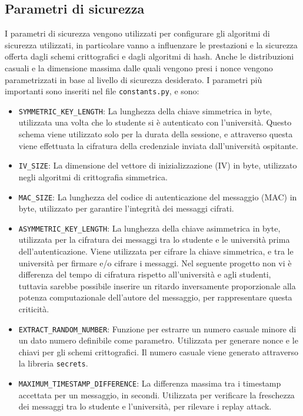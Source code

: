 \documentclass[a4paper,12pt]{article}
\begin{document}
\subsection{Parametri di sicurezza}
I parametri di sicurezza vengono utilizzati per configurare gli algoritmi di sicurezza utilizzati, in particolare vanno a influenzare le prestazioni e la sicurezza offerta dagli schemi crittografici e dagli algoritmi di hash. Anche le distribuzioni casuali e la dimensione massima dalle quali vengono presi i nonce vengono parametrizzati in base al livello di sicurezza desiderato. I parametri più importanti sono inseriti nel file \texttt{constants.py}, e sono:
\begin{itemize}
    \item \texttt{SYMMETRIC\_KEY\_LENGTH}: La lunghezza della chiave simmetrica in byte, utilizzata una volta che lo studente si è autenticato con l'università. Questo schema viene utilizzato solo per la durata della sessione, e attraverso questa viene effettuata la cifratura della credenziale inviata dall'università ospitante.
    \item \texttt{IV\_SIZE}: La dimensione del vettore di inizializzazione (IV) in byte, utilizzato negli algoritmi di crittografia simmetrica.
    \item \texttt{MAC\_SIZE}: La lunghezza del codice di autenticazione del messaggio (MAC) in byte, utilizzato per garantire l'integrità dei messaggi cifrati.
    \item \texttt{ASYMMETRIC\_KEY\_LENGTH}: La lunghezza della chiave asimmetrica in byte, utilizzata per la cifratura dei messaggi tra lo studente e le università prima dell'autenticazione. Viene utilizzata per cifrare la chiave simmetrica, e tra le università per firmare e/o cifrare i messaggi. Nel seguente progetto non vi è differenza del tempo di cifratura rispetto all'università e agli studenti, tuttavia sarebbe possibile inserire un ritardo inversamente proporzionale alla potenza computazionale dell'autore del messaggio, per rappresentare questa criticità.
    \item \texttt{EXTRACT\_RANDOM\_NUMBER}: Funzione per estrarre un numero casuale minore di un dato numero definibile come parametro. Utilizzata per generare nonce e le chiavi per gli schemi crittografici. Il numero casuale viene generato attraverso la libreria \texttt{secrets}.
    \item \texttt{MAXIMUM\_TIMESTAMP\_DIFFERENCE}: La differenza massima tra i timestamp accettata per un messaggio, in secondi. Utilizzata per verificare la freschezza dei messaggi tra lo studente e l'università, per rilevare i replay attack.

\end{itemize}
\end{document}
